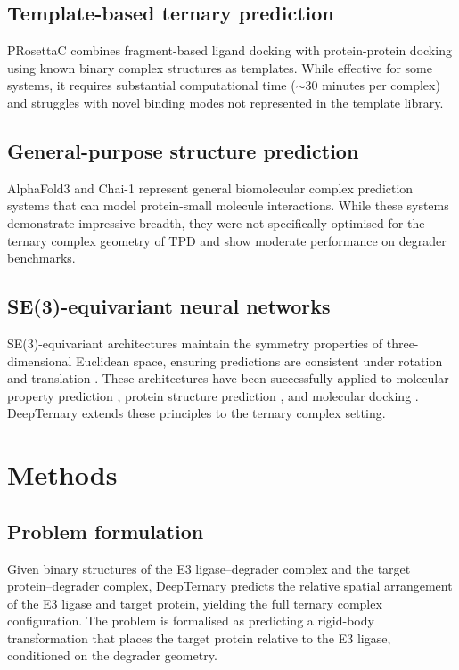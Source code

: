 \documentclass[11pt]{article}
\begin{document}
\subsection{Template-based ternary prediction}
PRosettaC \citep{zaidman2020} combines fragment-based ligand docking with protein-protein docking using known binary complex structures as templates. While effective for some systems, it requires substantial computational time ($\sim$30 minutes per complex) and struggles with novel binding modes not represented in the template library.

\subsection{General-purpose structure prediction}
AlphaFold3 \citep{abramson2024} and Chai-1 \citep{chai2024} represent general biomolecular complex prediction systems that can model protein-small molecule interactions. While these systems demonstrate impressive breadth, they were not specifically optimised for the ternary complex geometry of TPD and show moderate performance on degrader benchmarks.

\subsection{SE(3)-equivariant neural networks}
SE(3)-equivariant architectures maintain the symmetry properties of three-dimensional Euclidean space, ensuring predictions are consistent under rotation and translation \citep{thomas2018,satorras2021}. These architectures have been successfully applied to molecular property prediction \citep{schutt2018}, protein structure prediction \citep{jumper2021}, and molecular docking \citep{corso2023}. DeepTernary extends these principles to the ternary complex setting.

\section{Methods}

\subsection{Problem formulation}
Given binary structures of the E3 ligase--degrader complex and the target protein--degrader complex, DeepTernary predicts the relative spatial arrangement of the E3 ligase and target protein, yielding the full ternary complex configuration. The problem is formalised as predicting a rigid-body transformation that places the target protein relative to the E3 ligase, conditioned on the degrader geometry.
\end{document}
